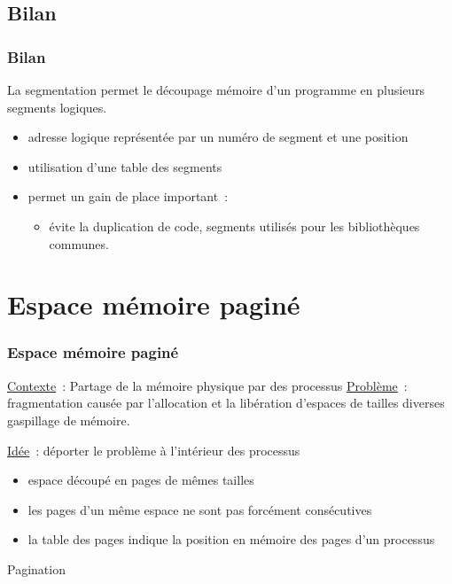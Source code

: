 \subsection{Bilan}
\begin{frame}
  \frametitle{Bilan}
  
  La segmentation permet le découpage mémoire d'un programme en plusieurs segments logiques.
  \begin{itemize}
  \item \alert{adresse logique} représentée par un numéro de segment et une position
  \item utilisation d'une \alert{table des segments}
  \item permet un gain de place important~: 
    \begin{itemize}
    \item évite la duplication de code, segments utilisés pour les \alert{bibliothèques communes}.
    \end{itemize}
  \end{itemize}
\end{frame}




\section{Espace mémoire paginé}
\begin{frame}
  \frametitle{Espace mémoire paginé}
 
  \underline{Contexte}~: Partage de la mémoire physique par des processus
  \underline{Problème}~: fragmentation causée par l'allocation et la libération
  d'espaces de tailles diverses  gaspillage de mémoire.  
  
  \underline{Idée}~: déporter le problème à l'intérieur des processus
  \begin{itemize}
  \item espace découpé en \alert{pages de mêmes tailles}
  \item les pages d'un même espace ne sont pas forcément consécutives
  \item la \alert{table des pages} indique la position en mémoire 
    des pages d'un processus
  \end{itemize}
   \alert{Pagination}
\end{frame}

